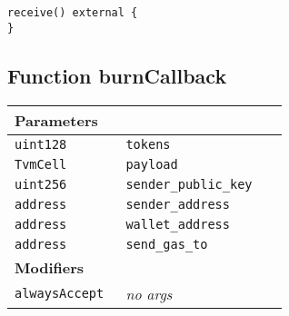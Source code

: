 \begin{lstlisting}[firstnumber=609]
receive() external {
}
\end{lstlisting}

\subsection{Function burnCallback}


\ifsoltables
\noindent\begin{tabular}{|l|l|p{5cm}|}\hline
\multicolumn{3}{|l|}{\bf Parameters}\\\hline
\tt uint128 & \tt tokens &\\\hline
\tt TvmCell & \tt payload &\\\hline
\tt uint256 & \tt sender\_{}public\_{}key &\\\hline
\tt address & \tt sender\_{}address &\\\hline
\tt address & \tt wallet\_{}address &\\\hline
\tt address & \tt send\_{}gas\_{}to &\\\hline
\multicolumn{3}{|l|}{\bf Modifiers}\\\hline
\tt alwaysAccept & {\em no args} &\\\hline
\end{tabular}
\fi

\vspace{2cm}

